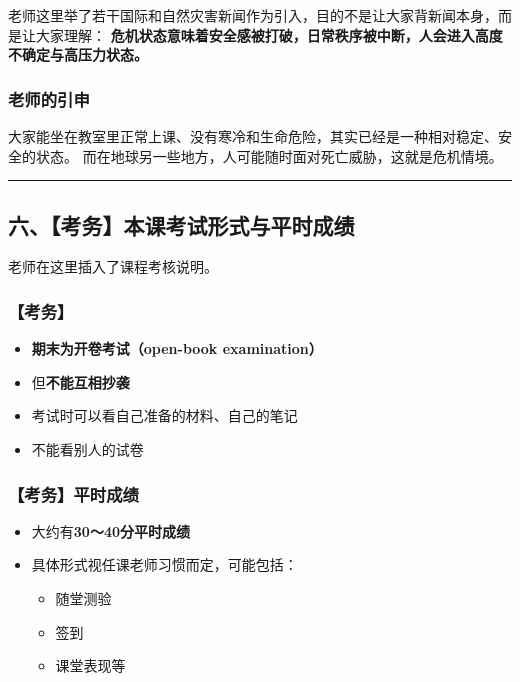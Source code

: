 \documentclass[
  chinese,
  9pt,
  a4paper,
]{ctexart}
\providecommand{\tightlist}{%
  \setlength{\itemsep}{0pt}\setlength{\parskip}{0pt}}
\begin{document}
老师这里举了若干国际和自然灾害新闻作为引入，目的不是让大家背新闻本身，而是让大家理解：
\textbf{危机状态意味着安全感被打破，日常秩序被中断，人会进入高度不确定与高压力状态。}

\subsubsection{老师的引申}\label{ux8001ux5e08ux7684ux5f15ux7533}

大家能坐在教室里正常上课、没有寒冷和生命危险，其实已经是一种相对稳定、安全的状态。
而在地球另一些地方，人可能随时面对死亡威胁，这就是危机情境。

\begin{center}\rule{0.5\linewidth}{0.5pt}\end{center}

\subsection{六、【考务】本课考试形式与平时成绩}\label{ux516dux8003ux52a1ux672cux8bfeux8003ux8bd5ux5f62ux5f0fux4e0eux5e73ux65f6ux6210ux7ee9}

老师在这里插入了课程考核说明。

\subsubsection{【考务】}\label{ux8003ux52a1}

\begin{itemize}
\tightlist
\item
  \textbf{期末为开卷考试（open-book examination）}
\item
  但\textbf{不能互相抄袭}
\item
  考试时可以看自己准备的材料、自己的笔记
\item
  不能看别人的试卷
\end{itemize}

\subsubsection{【考务】平时成绩}\label{ux8003ux52a1ux5e73ux65f6ux6210ux7ee9}

\begin{itemize}
\item
  大约有\textbf{30～40分平时成绩}
\item
  具体形式视任课老师习惯而定，可能包括：

  \begin{itemize}
  \tightlist
  \item
    随堂测验
  \item
    签到
  \item
    课堂表现等
  \end{itemize}
\end{itemize}
\end{document}
